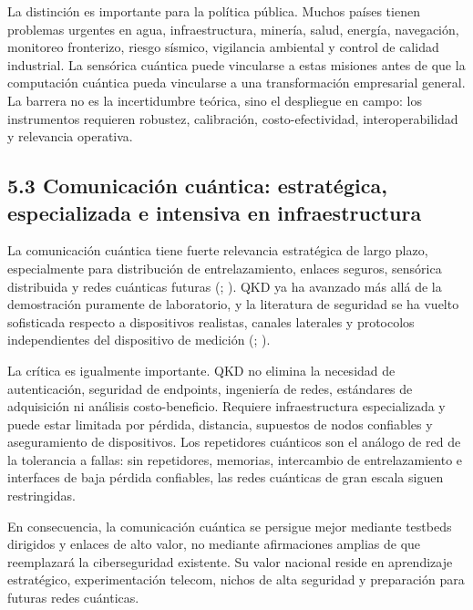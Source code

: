 \documentclass[
  11pt,
  letterpaper,
]{article}
\begin{document}
La distinción es importante para la política pública. Muchos países
tienen problemas urgentes en agua, infraestructura, minería, salud,
energía, navegación, monitoreo fronterizo, riesgo sísmico, vigilancia
ambiental y control de calidad industrial. La sensórica cuántica puede
vincularse a estas misiones antes de que la computación cuántica pueda
vincularse a una transformación empresarial general. La barrera no es la
incertidumbre teórica, sino el despliegue en campo: los instrumentos
requieren robustez, calibración, costo-efectividad, interoperabilidad y
relevancia operativa.

\subsection{5.3 Comunicación cuántica: estratégica, especializada e
intensiva en
infraestructura}\label{comunicaciuxf3n-cuuxe1ntica-estratuxe9gica-especializada-e-intensiva-en-infraestructura}

La comunicación cuántica tiene fuerte relevancia estratégica de largo
plazo, especialmente para distribución de entrelazamiento, enlaces
seguros, sensórica distribuida y redes cuánticas futuras
(;
). QKD ya ha
avanzado más allá de la demostración puramente de laboratorio, y la
literatura de seguridad se ha vuelto sofisticada respecto a dispositivos
realistas, canales laterales y protocolos independientes del dispositivo
de medición (;
).

La crítica es igualmente importante. QKD no elimina la necesidad de
autenticación, seguridad de endpoints, ingeniería de redes, estándares
de adquisición ni análisis costo-beneficio. Requiere infraestructura
especializada y puede estar limitada por pérdida, distancia, supuestos
de nodos confiables y aseguramiento de dispositivos. Los repetidores
cuánticos son el análogo de red de la tolerancia a fallas: sin
repetidores, memorias, intercambio de entrelazamiento e interfaces de
baja pérdida confiables, las redes cuánticas de gran escala siguen
restringidas.

En consecuencia, la comunicación cuántica se persigue mejor mediante
testbeds dirigidos y enlaces de alto valor, no mediante afirmaciones
amplias de que reemplazará la ciberseguridad existente. Su valor
nacional reside en aprendizaje estratégico, experimentación telecom,
nichos de alta seguridad y preparación para futuras redes cuánticas.
\end{document}
